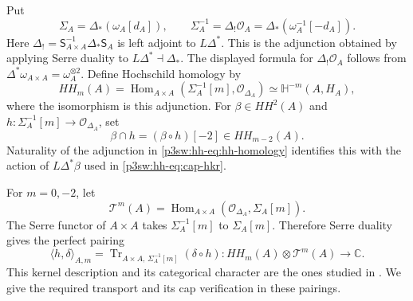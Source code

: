 \documentclass[11pt]{article}
\numberwithin{equation}{section}
\begin{document}
Put
\[
 \Sigma_A=\Delta_*(\omega_A[d_A]),\qquad
 \Sigma_A^{-1}=\Delta_!\mathcal O_A
               =\Delta_*(\omega_A^{-1}[-d_A]).
\]
Here
\(\Delta_!=\mathsf S_{A\times A}^{-1}\Delta_*\mathsf S_A\)
is left adjoint to \(L\Delta^*\).  This is the adjunction obtained
by applying Serre duality to \(L\Delta^*\dashv\Delta_*\).
The displayed formula for \(\Delta_!\mathcal O_A\) follows from
\(\Delta^*\omega_{A\times A}=\omega_A^{\otimes2}\).
Define Hochschild homology by
\begin{equation}
 HH_m(A)=\operatorname{Hom}_{A\times A}
              (\Sigma_A^{-1}[m],\mathcal O_{\Delta_A})
          \simeq\mathbb H^{-m}(A,H_A),
\label{p3sw:hh-eq:hh-homology}
\end{equation}
where the isomorphism is this adjunction.  For
\(\beta\in HH^2(A)\) and
\(h:\Sigma_A^{-1}[m]\to\mathcal O_{\Delta_A}\), set
\[
 \beta\cap h=(\beta\circ h)[-2]\in HH_{m-2}(A).
\]
Naturality of the adjunction in
\eqref{p3sw:hh-eq:hh-homology} identifies this with the action of
\(L\Delta^*\beta\) used in \eqref{p3sw:hh-eq:cap-hkr}.

For \(m=0,-2\), let
\[
 \mathscr T^m(A)=\operatorname{Hom}_{A\times A}
                 (\mathcal O_{\Delta_A},\Sigma_A[m]).
\]
The Serre functor of \(A\times A\) takes
\(\Sigma_A^{-1}[m]\) to \(\Sigma_A[m]\).  Therefore Serre duality
gives the perfect pairing
\begin{equation}
 \langle h,\delta\rangle_{A,m}
    =\operatorname{Tr}_{A\times A,\,\Sigma_A^{-1}[m]}
                      (\delta\circ h):
 HH_m(A)\otimes\mathscr T^m(A)\longrightarrow\mathbb C.
\label{p3sw:hh-eq:serre-pairing}
\end{equation}
This kernel description and its categorical character are the ones
studied in \cite[Theorems~6 and~10, Section~6.2]{P3HHCW}.
We give the required transport and its cap verification in these
pairings.
\end{document}
